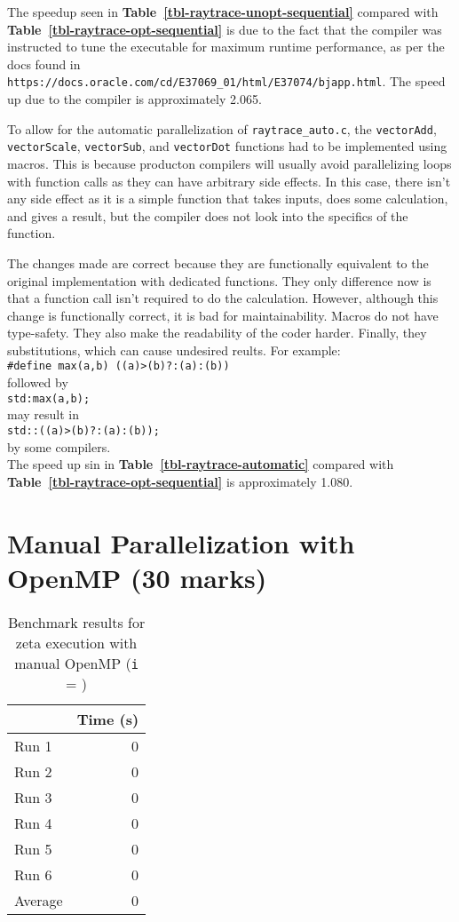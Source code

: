 \documentclass[12pt]{article}
\begin{document}
The speedup seen in {\bf Table~\ref{tbl-raytrace-unopt-sequential}} compared with {\bf Table~\ref{tbl-raytrace-opt-sequential}} is due to the fact that the compiler was instructed to tune the executable for maximum runtime performance, as per the docs found in {\tt https://docs.oracle.com/cd/E37069\_01/html/E37074/bjapp.html}. The speed up due to the compiler is approximately 2.065.

To allow for the automatic parallelization of {\tt raytrace\_auto.c}, the {\tt vectorAdd}, {\tt vectorScale}, {\tt vectorSub}, and {\tt vectorDot} functions had to be implemented using macros. This is because producton compilers will usually avoid parallelizing loops with function calls as they can have arbitrary side effects. In this case, there isn't any side effect as it is a simple function that takes inputs, does some calculation, and gives a result, but the compiler does not look into the specifics of the function.

The changes made are correct because they are functionally equivalent to the original implementation with dedicated functions. They only difference now is that a function call isn't required to do the calculation. However, although this change is functionally correct, it is bad for maintainability. Macros do not have type-safety. They also make the readability of the coder harder. Finally, they substitutions, which can cause undesired reults. For example: \\
{\tt \#define max(a,b) ((a)>(b)?:(a):(b))} \\
followed by \\
{\tt std:max(a,b);} \\
may result in \\
{\tt std::((a)>(b)?:(a):(b));} \\
by some compilers. \\

The speed up sin in {\bf Table~\ref{tbl-raytrace-automatic}} compared with {\bf Table~\ref{tbl-raytrace-opt-sequential}} is approximately 1.080.

\section*{Manual Parallelization with OpenMP (30 marks)}

\begin{table}[H]
  \centering
  \begin{tabular}{lr}
    & {\bf Time (s)} \\
    \hline
    Run 1 & 0 \\
    Run 2 & 0 \\
    Run 3 & 0 \\
    Run 4 & 0 \\
    Run 5 & 0 \\
    Run 6 & 0 \\
    \hline
    Average & 0 \\
  \end{tabular}
  \caption{Benchmark results for zeta execution with manual OpenMP ({\tt i} = \zetaIterations{})}
  \label{tbl-zeta-openmp}
\end{table}
\end{document}
